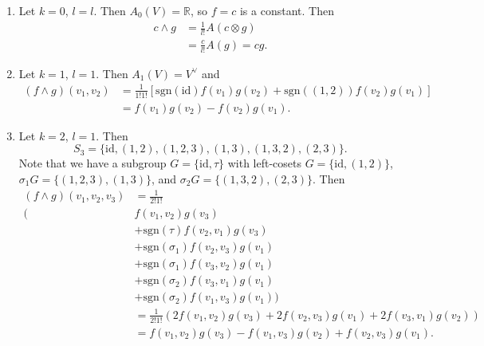 \begin{xmpl}
  \begin{enumerate}
    \item{
      Let $k = 0$, $l = l$. Then $A_0(V) = \mathbb{R}$, so $f = c$ is a
      constant. Then
      \begin{align*}
         c \wedge g
      &= \frac{1}{l!}
         A(c \otimes g) \\
      &= \frac{c}{l!}
           A(g)
       = c g.
      \end{align*}
    }
    \item{
      Let $k = 1$, $l = 1$. Then
      $A_1(V) = V^\vee$ and
      \begin{align*}
         (f \wedge g)(v_1, v_2)
      &= \frac{1}{1! 1!}
           \left[
             \mathrm{sgn}(\mathrm{id})
             f(v_1)g(v_2)
           + \mathrm{sgn}((1,2))
             f(v_2)g(v_1)
           \right] \\
      &= f(v_1)g(v_2) - f(v_2)g(v_1).
      \end{align*}
    }
    \item{
      Let $k = 2$, $l = 1$. Then
      $$
        S_3
      = \{ \mathrm{id}
         , (1, 2)
         , (1, 2, 3)
         , (1, 3)
         , (1, 3, 2)
         , (2, 3)
        \}.
      $$
      Note that we have a subgroup $G = \{\mathrm{id}, \tau\}$ with
      left-cosets $G = \{\mathrm{id}, (1,2)\}$,
      $\sigma_1 G = \{ (1, 2, 3), (1, 3) \}$, and
      $\sigma_2 G = \{ (1, 3, 2), (2, 3) \}$. Then
      \begin{align*}
         (f \wedge g)(v_1, v_2, v_3)
      &= \frac{1}{2! 1!} \\
      (& f(v_1, v_2) g(v_3) \\
      &+ \mathrm{sgn}(\tau)
         f(v_2, v_1)
         g(v_3) \\
      &+ \mathrm{sgn}(\sigma_1)
         f(v_2, v_3)
         g(v_1) \\
      &+ \mathrm{sgn}(\sigma_1)
         f(v_3, v_2)
         g(v_1) \\
      &+ \mathrm{sgn}(\sigma_2)
         f(v_3, v_1)
         g(v_1) \\
      &+ \mathrm{sgn}(\sigma_2)
         f(v_1, v_3)
         g(v_1)) \\
      &= \frac{1}{2! 1!}(
         2 f(v_1, v_2) g(v_3)
       + 2 f(v_2, v_3) g(v_1)
       + 2 f(v_3, v_1) g(v_2)) \\
      &= f(v_1, v_2) g(v_3)
       - f(v_1, v_3) g(v_2)
       + f(v_2, v_3) g(v_1).
      \end{align*}

}
\end{enumerate}
\end{xmpl}
